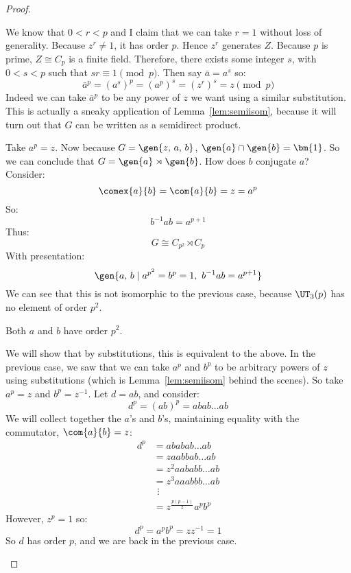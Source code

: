 \begin{proof}
\begin{case}
        We know that \(0 < r < p\) and I claim that we can take \(r = 1\) without loss of generality.
        Because \(z^r \neq 1\), it has order \(p\).
        Hence \(z^r\) generates \(Z\).
        Because \(p\) is prime, \(Z \cong C_p\) is a finite field.
        Therefore, there exists some integer \(s\), with \(0 < s < p\) such that \(sr \equiv 1 \pmod{p}\).
        Then say \(\bar{a} = a^s\) so:
        \[\bar{a}^p = {(a^s)}^p = {(a^p)}^s = {(z^r)}^s = z \pmod{p}\]
        Indeed we can take \(\bar{a}^p\) to be any power of \(z\) we want using a similar substitution.
        This is actually a sneaky application of Lemma~\ref{lem:semiisom}, because it will turn out that \(G\) can be
        written as a semidirect product.

        Take \(a^p = z\).
        Now because \(G = \gen{z,\,a,\,b}\), \(\gen{a} \cap \gen{b} = \bm{1}\).
        So we can conclude that \(G = \gen{a} \rtimes \gen{b}\).
        How does \(b\) conjugate \(a\)?
        Consider:
        \[\comex{a}{b} = \com{a}{b} = z = a^p\]
        So:
        \[b^{-1}ab = a^{p + 1}\]
        Thus:
        \[G \cong C_{p^2} \rtimes C_p\]
        With presentation:
        \[\gen{a,\,b \mid a^{p^2} = b^p = 1,\ b^{-1}ab = a^{p + 1}}\]
        We can see that this is not isomorphic to the previous case, because \(\UT_3(p)\) has no element of order \(p^2\).

    \item Both \(a\) and \(b\) have order \(p^2\).

        We will show that by substitutions, this is equivalent to the above.
        In the previous case, we saw that we can take \(a^p\) and \(b^p\) to be arbitrary powers of \(z\) using
        substitutions (which is Lemma~\ref{lem:semiisom} behind the scenes).
        So take \(a^p = z\) and \(b^p = z^{-1}\).
        Let \(d = ab\), and consider:
        \[ d^p = {(ab)}^p = abab\ldots ab\]
        We will collect together the \(a\)'s and \(b\)'s, maintaining equality with the commutator, \(\com{a}{b} = z\):
        \begin{align*}
            d^p &= ababab\ldots ab \\
            &= z aabbab\ldots ab \\
            &= z^2 aababb\ldots ab \\
            &= z^3 aaabbb\ldots ab \\
            &\ \,\vdots \\  %
            &= z^{\frac{p(p-1)}{2}} a^p b^p \tag{\ddag} \label{eqn:p_cubed_ddag}
        \end{align*}
        However, \(z^p = 1\) so:
        \[d^p = a^p b^p = zz^{-1} = 1\]
        So \(d\) has order \(p\), and we are back in the previous case.
\end{case}
\end{proof}

